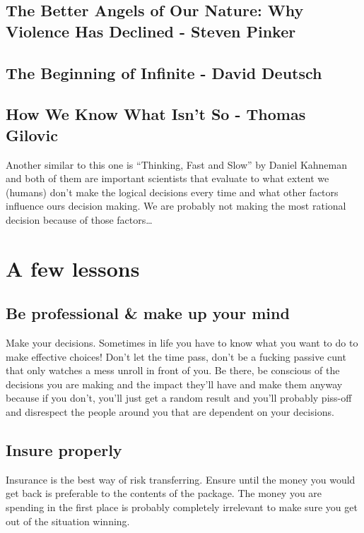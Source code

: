 \subsection{The Better Angels of Our Nature: Why Violence Has Declined - Steven Pinker}

\subsection{The Beginning of Infinite - David Deutsch}

\subsection{How We Know What Isn't So - Thomas Gilovic}

Another similar to this one is ``Thinking, Fast and Slow'' by Daniel Kahneman and both of them are important scientists that evaluate to what extent we (humans) don't make the logical decisions every time and what other factors influence ours decision making. We are probably not making the most rational decision because of those factors\dots






\section{A few lessons}

\subsection{Be professional \& make up your mind}
Make your decisions. Sometimes in life you have to know what you want to do to make effective choices! Don't let the time pass, don't be a fucking passive cunt that only watches a mess unroll in front of you. Be there, be conscious of the decisions you are making and the impact they'll have and make them anyway because if you don't, you'll just get a random result and you'll probably piss-off and disrespect the people around you that are dependent on your decisions.


\subsection{Insure properly}
Insurance is the best way of risk transferring. Ensure until the money you would get back is preferable to the contents of the package. The money you are spending in the first place is probably completely irrelevant to make sure you get out of the situation winning.

